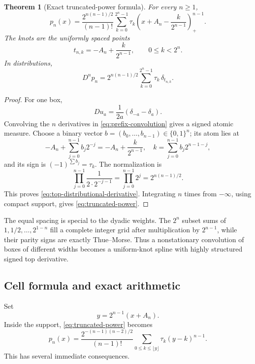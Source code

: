 \documentclass[11pt]{article}
\newtheorem{theorem}{Theorem}[section]
\theoremstyle{definition}
\theoremstyle{remark}
\begin{document}
\begin{theorem}[Exact truncated-power formula]
\label{thm:truncated-power}
For every $n\ge1$,
\begin{equation}
 \boxed{
 p_n(x)=\frac{2^{n(n-1)/2}}{(n-1)!}
 \sum_{k=0}^{2^n-1}\tau_k
 \left(x+A_n-\frac{k}{2^{n-1}}\right)_+^{n-1}.}
 \label{eq:truncated-power}
\end{equation}
The knots are the uniformly spaced points
\begin{equation}
 t_{n,k}=-A_n+\frac{k}{2^{n-1}},
 \qquad 0\le k<2^n.
 \label{eq:knots}
\end{equation}
In distributions,
\begin{equation}
 D^np_n=2^{n(n-1)/2}\sum_{k=0}^{2^n-1}\tau_k\,\delta_{t_{n,k}}.
 \label{eq:top-distributional-derivative}
\end{equation}
\end{theorem}

\begin{proof}
For one box,
\[
 Du_a=\frac{1}{2a}(\delta_{-a}-\delta_a).
\]
Convolving the $n$ derivatives in \cref{eq:prefix-convolution} gives a signed atomic
measure.  Choose a binary vector $b=(b_0,\ldots,b_{n-1})\in\{0,1\}^n$; its atom lies at
\[
 -A_n+\sum_{j=0}^{n-1}b_j2^{-j}
 =-A_n+\frac{k}{2^{n-1}},
 \quad
 k=\sum_{j=0}^{n-1}b_j2^{n-1-j},
\]
and its sign is $(-1)^{\sum b_j}=\tau_k$.  The normalization is
\[
 \prod_{j=0}^{n-1}\frac{1}{2\cdot2^{-j-1}}
 =\prod_{j=0}^{n-1}2^j=2^{n(n-1)/2}.
\]
This proves \cref{eq:top-distributional-derivative}.  Integrating $n$ times from
$-\infty$, using compact support, gives \cref{eq:truncated-power}.
\end{proof}

The equal spacing is special to the dyadic weights.  The $2^n$ subset sums of
$1,1/2,\ldots,2^{1-n}$ fill a complete integer grid after multiplication by
$2^{n-1}$, while their parity signs are exactly Thue--Morse.  Thus a nonstationary
convolution of boxes of different widths becomes a uniform-knot spline with highly
structured signed top derivative.

\subsection{Cell formula and exact arithmetic}

Set
\begin{equation}
 y=2^{n-1}(x+A_n).
 \label{eq:cell-coordinate}
\end{equation}
Inside the support, \cref{eq:truncated-power} becomes
\begin{equation}
 p_n(x)=\frac{2^{-(n-1)(n-2)/2}}{(n-1)!}
 \sum_{0\le k\le\lfloor y\rfloor}\tau_k(y-k)^{n-1}.
 \label{eq:scaled-cell-formula}
\end{equation}
This has several immediate consequences.
\end{document}
